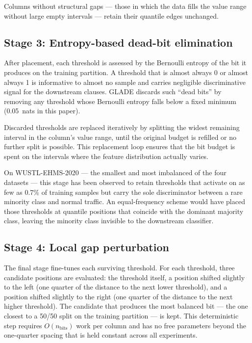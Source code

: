\documentclass[journal,10pt]{IEEEtran}
\begin{document}
Columns without structural gaps --- those in which the data fills the
value range without large empty intervals --- retain their quantile
edges unchanged.

\subsection{Stage 3: Entropy-based dead-bit elimination}
\label{sec:glade-dead}

After placement, each threshold is assessed by the Bernoulli entropy
of the bit it produces on the training partition. A threshold that is
almost always 0 or almost always 1 is informative to almost no
sample and carries negligible discriminative signal for the downstream
clauses. GLADE discards such ``dead bits'' by removing any threshold
whose Bernoulli entropy falls below a fixed minimum (0.05~nats in
this paper).

Discarded thresholds are replaced iteratively by splitting the widest
remaining interval in the column's value range, until the original
budget is refilled or no further split is possible. This replacement
loop ensures that the bit budget is spent on the intervals where the
feature distribution actually varies.

On WUSTL-EHMS-2020 --- the smallest and most imbalanced of the four
datasets --- this stage has been observed to retain thresholds that
activate on as few as 0.7\% of training samples but carry the sole
discriminator between a rare minority class and normal traffic. An
equal-frequency scheme would have placed those thresholds at
quantile positions that coincide with the dominant majority class,
leaving the minority class invisible to the downstream classifier.

\subsection{Stage 4: Local gap perturbation}
\label{sec:glade-perturb}

The final stage fine-tunes each surviving threshold. For each
threshold, three candidate positions are evaluated: the threshold
itself, a position shifted slightly to the left (one quarter of the
distance to the next lower threshold), and a position shifted slightly
to the right (one quarter of the distance to the next higher
threshold). The candidate that produces the most balanced bit ---
the one closest to a 50/50 split on the training partition ---
is kept. This deterministic step requires $O(n_\text{bits})$ work
per column and has no free parameters beyond the one-quarter spacing
that is held constant across all experiments.
\end{document}
